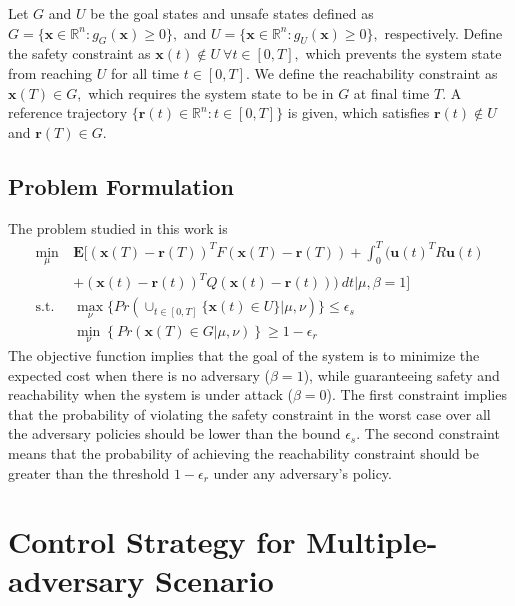 \documentclass[journal]{IEEEtran}
\begin{document}
Let $G$ and $U$ be the goal states and unsafe states defined as 
$G = \{\mathbf{x} \in \mathbb{R}^n: g_G(\mathbf{x}) \geq 0\},$ and $U = \{\mathbf{x} \in \mathbb{R}^n: g_U(\mathbf{x}) \geq 0\},$ respectively.
Define the safety constraint as $\mathbf{x}(t) \notin U \ \forall t \in [0,T],$ which prevents the system state from reaching $U$ for all time $t \in [0,T].$ 
We define the reachability constraint as
$\mathbf{x}(T) \in G,$ which requires the system state to be in $G$ at final time $T.$ A reference trajectory $\{\mathbf{r}(t) \in \mathbb{R}^n : t \in [0,T]\}$ is given, which satisfies $\mathbf{r}(t) \notin U$ and $\mathbf{r}(T) \in G$.

\subsection{Problem Formulation}
The problem studied in this work is 
\begin{align}
\label{eq:problem-form}
    \min_{\mu} \ & \mathbf{E}[(\mathbf{x}(T)-\mathbf{r}(T))^{T}F(\mathbf{x}(T)-\mathbf{r}(T)) + \int_{0}^{T}{(\mathbf{u}(t)^{T}R\mathbf{u}(t) }\nonumber\\
    &+ (\mathbf{x}(t)-\mathbf{r}(t))^{T}Q(\mathbf{x}(t)-\mathbf{r}(t))  
    ) \ dt | \mu, \beta = 1 ] \\
    \mbox{s.t.} \ & \max_{\nu}{\{Pr(\cup_{t \in [0,T]}{\{\mathbf{x}(t) \in U\}} | \mu, \nu)\}} \leq \epsilon_s  \nonumber\\ 
    & \min_{\nu}{\left\{Pr(\mathbf{x}(T) \in G | \mu, \nu)\right\}} \geq 1-\epsilon_r\nonumber
\end{align}
The objective function implies that the goal of the system is to minimize the expected cost when there is no adversary ($\beta = 1$), while guaranteeing safety and reachability when the system is under attack ($\beta = 0$).
The first constraint implies that the probability of violating the safety constraint in the worst case over all the adversary policies should be lower than the bound $\epsilon_s.$ The second constraint means that the probability of achieving the reachability constraint should be greater than the threshold $1 - \epsilon_r$ under any adversary's policy.



\section{Control Strategy for Multiple-adversary Scenario}
\label{Multiple-adversarial-scenario}
\end{document}
